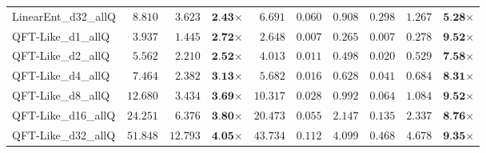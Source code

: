 \begin{table*}[t]
{\begin{tabular}{| l || r r c || r r r r r c |}
LinearEnt\_d32\_allQ & $8.810$ & $3.623$ & $\textbf{2.43}$$\times$ & $6.691$ & $0.060$ & $0.908$ & $0.298$ & $1.267$ & $\textbf{5.28}$$\times$ \\
QFT-Like\_d1\_allQ & $3.937$ & $1.445$ & $\textbf{2.72}$$\times$ & $2.648$ & $0.007$ & $0.265$ & $0.007$ & $0.278$ & $\textbf{9.52}$$\times$ \\
QFT-Like\_d2\_allQ & $5.562$ & $2.210$ & $\textbf{2.52}$$\times$ & $4.013$ & $0.011$ & $0.498$ & $0.020$ & $0.529$ & $\textbf{7.58}$$\times$ \\
QFT-Like\_d4\_allQ & $7.464$ & $2.382$ & $\textbf{3.13}$$\times$ & $5.682$ & $0.016$ & $0.628$ & $0.041$ & $0.684$ & $\textbf{8.31}$$\times$ \\
QFT-Like\_d8\_allQ & $12.680$ & $3.434$ & $\textbf{3.69}$$\times$ & $10.317$ & $0.028$ & $0.992$ & $0.064$ & $1.084$ & $\textbf{9.52}$$\times$ \\
QFT-Like\_d16\_allQ & $24.251$ & $6.376$ & $\textbf{3.80}$$\times$ & $20.473$ & $0.055$ & $2.147$ & $0.135$ & $2.337$ & $\textbf{8.76}$$\times$ \\
QFT-Like\_d32\_allQ & $51.848$ & $12.793$ & $\textbf{4.05}$$\times$ & $43.734$ & $0.112$ & $4.099$ & $0.468$ & $4.678$ & $\textbf{9.35}$$\times$ \\
\hline
\end{tabular}
}
\end{table*}
